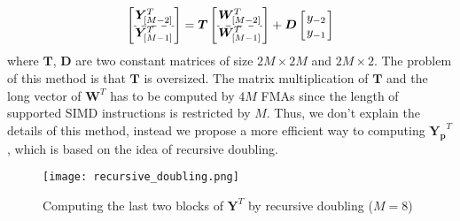 \begin{equation*}
    \begin{aligned}
        \left[\arraycolsep=1.0pt\def\arraystretch{1.0}
                \begin{array}{c}
                \bm{Y}^T_{[M-2]} \\ [0.5ex] \hdashline 
                \bm{Y}^T_{[M-1]} \\ 
                \end{array}\right] = \bm{T} \left[\arraycolsep=1.0pt\def\arraystretch{1.0}
                \begin{array}{c}
                \bm{W}^T_{[M-2]} \\ [0.5ex] \hdashline
                \bm{W}^T_{[M-1]} \\ 
                \end{array}\right] + \bm{D} \left[\arraycolsep=1.0pt\def\arraystretch{1.0}
                \begin{array}{c}
                y_{-2} \\  
                y_{-1} \\ 
                \end{array}\right] \\
    \end{aligned}
\end{equation*}
where $\bm{T}$, $\bm{D}$ are two constant matrices of size $2M \times 2M$ and $2M \times 2$.
The problem of this method is that $\bm{T}$ is oversized.
The matrix multiplication of $\bm{T}$ and the long vector of $\bm{W}^T$
has to be computed by $4M$ FMAs 
since the length of supported SIMD instructions is restricted by $M$.
Thus, we don't explain the details of this method,
instead we propose a more efficient way to computing 
$\bm{Y_p}^T$, which is based on the idea of recursive doubling.

\begin{figure}[t]
    \centerline{\texttt{[image: recursive\_doubling.png]}}
    \caption{Computing the last two blocks of $\bm{Y}^T$ by recursive doubling ($M=8$)}
    \label{fig:Recursive_doubling}
  \end{figure}

